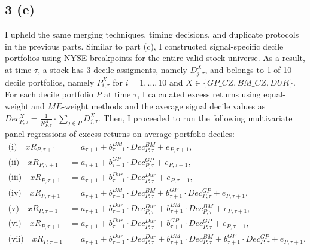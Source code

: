 \documentclass[11pt]{article}
\begin{document}
\subsection*{3 (e)}
I upheld the same merging techniques, timing decisions, and duplicate protocols in the previous parts. Similar to part (c), I constructed signal-specific decile portfolios using NYSE breakpoints for the entire valid stock universe. As a result, at time $\tau$, a stock has 3 decile assigments, namely $D_{j,\tau}^{X}$, and belongs to 1 of 10 decile portfolios, namely $P_{i, \tau}^{X}$ for $i = 1,\ldots,10$ and $X \in \{GP\_CZ, BM\_CZ, DUR\}$. For each decile portfolio $P$ at time $\tau$, I calculated excess returns using equal-weight and $ME$-weight methods and the average signal decile values as $Dec_{P, \tau}^{X} = \frac{1}{N_{P, \tau}^{X}} \cdot \sum_{j \in P} D_{j,\tau}^{X}$. Then, I proceeded to run the following multivariate panel regressions of excess returns on average portfolio deciles: 
\[
\begin{aligned}
\text{(i)}\quad
xR_{P,\tau+1}
&=
a_{\tau+1}
+b^{BM}_{\tau+1} \cdot Dec^{BM}_{P,\tau}
+e_{P,\tau+1},
\\[4pt]
\text{(ii)}\quad
xR_{P,\tau+1}
&=
a_{\tau+1}
+b^{GP}_{\tau+1} \cdot Dec^{GP}_{P,\tau}
+e_{P,\tau+1},
\\[4pt]
\text{(iii)}\quad
xR_{P,\tau+1}
&=
a_{\tau+1}
+b^{Dur}_{\tau+1} \cdot Dec^{Dur}_{P,\tau}
+e_{P,\tau+1},
\\[4pt]
\text{(iv)}\quad
xR_{P,\tau+1}
&=
a_{\tau+1}
+b^{BM}_{\tau+1} \cdot Dec^{BM}_{P,\tau}
+b^{GP}_{\tau+1} \cdot Dec^{GP}_{P,\tau}
+e_{P,\tau+1},
\\[4pt]
\text{(v)}\quad
xR_{P,\tau+1}
&=
a_{\tau+1}
+b^{Dur}_{\tau+1} \cdot Dec^{Dur}_{P,\tau}
+b^{BM}_{\tau+1} \cdot Dec^{BM}_{P,\tau}
+e_{P,\tau+1},
\\[4pt]
\text{(vi)}\quad
xR_{P,\tau+1}
&=
a_{\tau+1}
+b^{Dur}_{\tau+1} \cdot Dec^{Dur}_{P,\tau}
+b^{GP}_{\tau+1} \cdot Dec^{GP}_{P,\tau}
+e_{P,\tau+1},
\\[4pt]
\text{(vii)}\quad
xR_{P,\tau+1}
&=
a_{\tau+1}
+b^{Dur}_{\tau+1} \cdot Dec^{Dur}_{P,\tau}
+b^{BM}_{\tau+1} \cdot Dec^{BM}_{P,\tau}
+b^{GP}_{\tau+1} \cdot Dec^{GP}_{P,\tau}
+e_{P,\tau+1}.
\end{aligned}
\]
\end{document}
